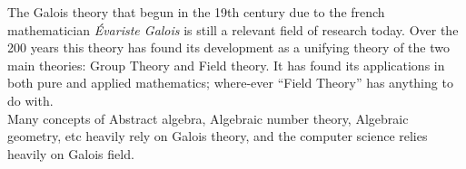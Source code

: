 The Galois theory that begun in the 19th century due to the french mathematician \textit{Évariste Galois} is still a relevant field of research today. Over the 200 years this theory has found its development as a unifying theory of the two main theories: Group Theory and Field theory. It has found its applications in both pure and applied mathematics; where-ever ``Field Theory'' has anything to do with.\\
Many concepts of Abstract algebra, Algebraic number theory, Algebraic geometry, etc heavily rely on Galois theory, and the computer science relies heavily on Galois field.